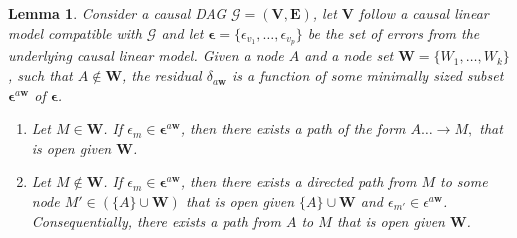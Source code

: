 \documentclass[11pt,a4paper]{article}
\newtheorem{Lemma}[Satz]{Lemma}
\theoremstyle{definition}
\theoremstyle{remark}
\DeclareMathOperator{\de}{de}
\newcommand{\g}[1][G]{\mathcal{#1}}
\begin{document}
%

\begin{Lemma}
	Consider a causal DAG $\g=(\mathbf{V},\mathbf{E})$, let $\mathbf{V}$ follow a causal linear model compatible with $\g$ and let $\boldsymbol{\epsilon}= \{\epsilon_{v_1},\dots, \epsilon_{v_p}\}$ be the set of errors from the underlying causal linear model. Given a node $A$ and a node set $\mathbf{W}=\{W_1,\dots,W_k\}$, such that $A \notin \mathbf{W}$, the residual $\delta_{a\mathbf{w}}$ is a function of some minimally sized subset $\boldsymbol{\epsilon}^{a\mathbf{w}}$ of $\boldsymbol{\epsilon}$. 
	\begin{enumerate}
		\item Let $M \in \mathbf{W}$. If $\epsilon_m \in \boldsymbol{\epsilon}^{a\mathbf{w}}$, then there exists a path of the form 
		$
		A \dots \rightarrow M,
		$
		that is open given $\mathbf{W}$.  \label{in}
		\item Let $M \notin \mathbf{W}$. If $\epsilon_m \in \boldsymbol{\epsilon}^{a\mathbf{w}}$, then there exists  a directed path from $M$ to some node $M' \in (\{A\} \cup \mathbf{W})$ that is open given $\{A\} \cup \mathbf{W}$ and $\epsilon_{m'} \in \epsilon^{a\mathbf{w}}$. Consequentially, there exists a path from $A$ to $M$ that is open given $\mathbf{W}$.
		 \label{out}		
%		
	\end{enumerate}
	\label{open}
\end{Lemma}
\end{document}
